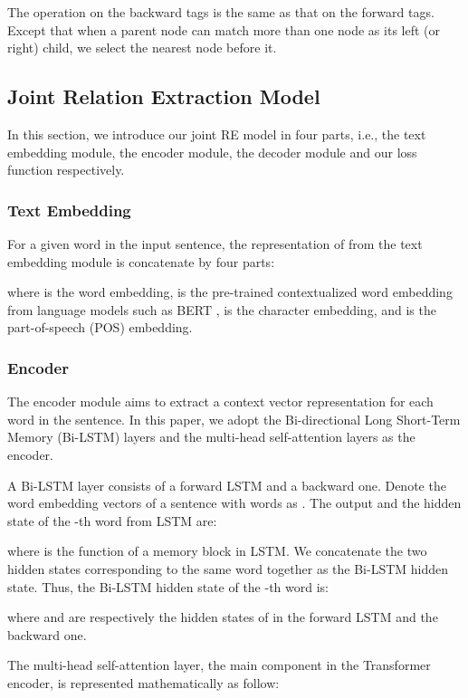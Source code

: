 \documentclass[conference]{IEEEtran}
\begin{document}
The operation on the backward tags is the same as that on the forward tags. Except that when a parent node can match more than one node as its left (or right) child, we select the nearest node before it.

\subsection{Joint Relation Extraction Model}
\label{ssec:model}



In this section, we introduce our joint RE model in four parts, i.e., the text embedding module, the encoder module, the decoder module and our loss function respectively.

\subsubsection{Text Embedding}
For a given word  in the input sentence, the representation  of  from the text embedding module is concatenate by four parts:

where  is the word embedding,  is the pre-trained contextualized word embedding from language models such as BERT \cite{Devlin2019BERT},  is the character embedding, and  is the part-of-speech (POS) embedding.

\subsubsection{Encoder}
The encoder module aims to extract a context vector representation for each word in the sentence. In this paper, we adopt the Bi-directional Long Short-Term Memory (Bi-LSTM) layers and the multi-head self-attention layers as the encoder.

A Bi-LSTM layer consists of a forward LSTM \cite{Hochreiter1997Long} and a backward one. Denote the word embedding vectors of a sentence with  words as . The output  and the hidden state  of the -th word  from LSTM are:

where  is the function of a memory block in LSTM. We concatenate the two hidden states corresponding to the same word together as the Bi-LSTM hidden state. Thus, the Bi-LSTM hidden state  of the -th word  is:

where  and  are respectively the hidden states of  in the forward LSTM and the backward one. 


The multi-head self-attention layer, the main component in the Transformer \cite{Vaswani2017Attention} encoder, is represented mathematically as follow:
\end{document}
